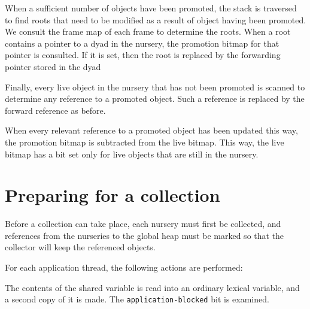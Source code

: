 When a sufficient number of objects have been promoted, the stack is
traversed to find roots that need to be modified as a result of object
having been promoted.  We consult the frame map of each frame to
determine the roots.  When a root contains a pointer to a dyad in the
nursery, the promotion bitmap for that pointer is consulted.  If it is
set, then the root is replaced by the forwarding pointer stored in the
dyad

Finally, every live object in the nursery that has not been promoted
is scanned to determine any reference to a promoted object.  Such a
reference is replaced by the forward reference as before.

When every relevant reference to a promoted object has been updated
this way, the promotion bitmap is subtracted from the live
bitmap.  This way, the live bitmap has a bit set only for live
objects that are still in the nursery.

\section{Preparing for a collection}

Before a collection can take place, each nursery must first be
collected, and references from the nurseries to the global heap must
be marked so that the collector will keep the referenced
objects.

For each application thread, the following actions are performed:

The contents of the shared variable is read into an ordinary lexical
variable, and a second copy of it is made.  The
\texttt{application-blocked} bit is examined.

